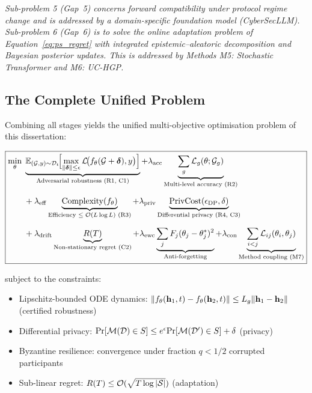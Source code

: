 \emph{Sub-problem 5 (Gap~5) concerns forward compatibility under protocol regime change and is addressed by a domain-specific foundation model (CyberSecLLM). Sub-problem 6 (Gap~6) is to solve the online adaptation problem of Equation~\eqref{eq:ps_regret} with integrated epistemic--aleatoric decomposition and Bayesian posterior updates. This is addressed by Methods M5: Stochastic Transformer and M6: UC-HGP.}


\subsection{The Complete Unified Problem}

Combining all stages yields the unified multi-objective optimisation problem of this dissertation:

\begin{equation}
\boxed{
\begin{aligned}
\min_\theta\;&
\underbrace{\mathbb{E}_{(\mathcal{G},y)\sim\mathcal{D}_t}\!\Bigl[
  \max_{\|\boldsymbol{\delta}\|\le\epsilon}
    \mathcal{L}\!\bigl(f_\theta(\mathcal{G}+\boldsymbol{\delta}),y\bigr)
\Bigr]}_{\text{Adversarial robustness (R1, C1)}}
+ \lambda_{\mathrm{acc}}\underbrace{\sum_g\mathcal{L}_g(\theta;\mathcal{G}_g)}_{\text{Multi-level accuracy (R2)}}
\\[6pt]
&+ \lambda_{\mathrm{eff}}\underbrace{\mathrm{Complexity}(f_\theta)}_{\text{Efficiency $\le\mathcal{O}(L\log L)$ (R3)}}
+ \lambda_{\mathrm{priv}}\underbrace{\mathrm{PrivCost}(\epsilon_{\mathrm{DP}},\delta)}_{\text{Differential privacy (R4, C3)}}
\\[6pt]
&+ \lambda_{\mathrm{drift}}\underbrace{R(T)}_{\text{Non-stationary regret (C2)}}
+ \lambda_{\mathrm{ewc}}\underbrace{\sum_j F_j(\theta_j-\theta_j^*)^2}_{\text{Anti-forgetting}}
+ \lambda_{\mathrm{con}}\underbrace{\sum_{i<j}\mathcal{L}_{ij}(\theta_i,\theta_j)}_{\text{Method coupling (M7)}}
\end{aligned}
}
\label{eq:ps_unified}
\end{equation}

\noindent subject to the constraints:
\begin{itemize}
\item Lipschitz-bounded ODE dynamics: $\|f_\theta(\mathbf{h}_1,t)-f_\theta(\mathbf{h}_2,t)\|\le L_g\|\mathbf{h}_1-\mathbf{h}_2\|$ (certified robustness)
\item Differential privacy: $\mathrm{Pr}[\mathcal{M}(\mathcal{D})\in S]\le e^{\epsilon}\mathrm{Pr}[\mathcal{M}(\mathcal{D}')\in S]+\delta$ (privacy)
\item Byzantine resilience: convergence under fraction $q<1/2$ corrupted participants
\item Sub-linear regret: $R(T)\le\mathcal{O}(\sqrt{T\log|\mathcal{S}|})$ (adaptation)
\end{itemize}

